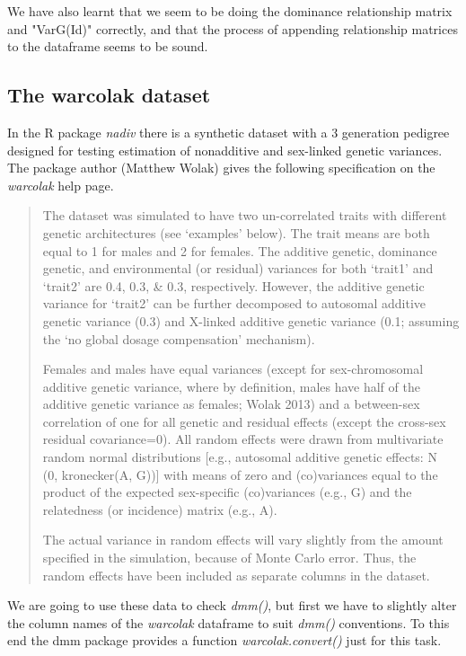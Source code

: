 \documentclass[titlepage]{article}  %
\begin{document}
We have also learnt that we seem to be doing the dominance relationship matrix and "VarG(Id)" correctly, and that the process of appending relationship matrices to the dataframe seems to be sound.
 


\clearpage
\subsection{The warcolak dataset}
 In the R package {\em nadiv} there is a synthetic dataset with a 3 generation pedigree designed for testing estimation of nonadditive and sex-linked genetic variances. The package author (Matthew Wolak) gives the following specification on the {\em warcolak} help page.

\begin{quotation}
     The dataset was simulated to have two un-correlated traits with
     different genetic architectures (see ‘examples’ below). The trait
     means are both equal to 1 for males and 2 for females. The
     additive genetic, dominance genetic, and environmental (or
     residual) variances for both ‘trait1’ and ‘trait2’ are 0.4, 0.3, \&
     0.3, respectively. However, the additive genetic variance for
     ‘trait2’ can be further decomposed to autosomal additive genetic
     variance (0.3) and X-linked additive genetic variance (0.1;
     assuming the ‘no global dosage compensation’ mechanism).

     Females and males have equal variances (except for sex-chromosomal
     additive genetic variance, where by definition, males have half of
     the additive genetic variance as females; Wolak 2013) and a
     between-sex correlation of one for all genetic and residual
     effects (except the cross-sex residual covariance=0). All random
     effects were drawn from multivariate random normal distributions
     [e.g., autosomal additive genetic effects: N ~ (0, kronecker(A,
     G))] with means of zero and (co)variances equal to the product of
     the expected sex-specific (co)variances (e.g., G) and the
     relatedness (or incidence) matrix (e.g., A).

     The actual variance in random effects will vary slightly from the
     amount specified in the simulation, because of Monte Carlo error.
     Thus, the random effects have been included as separate columns in
     the dataset.
\end{quotation}

 We are going to use these data to check {\em dmm()}, but first we have to slightly alter the column names of the {\em warcolak} dataframe to suit {\em dmm()} conventions. To this end the dmm package provides a function {\em warcolak.convert()} just for this task.
\end{document}
